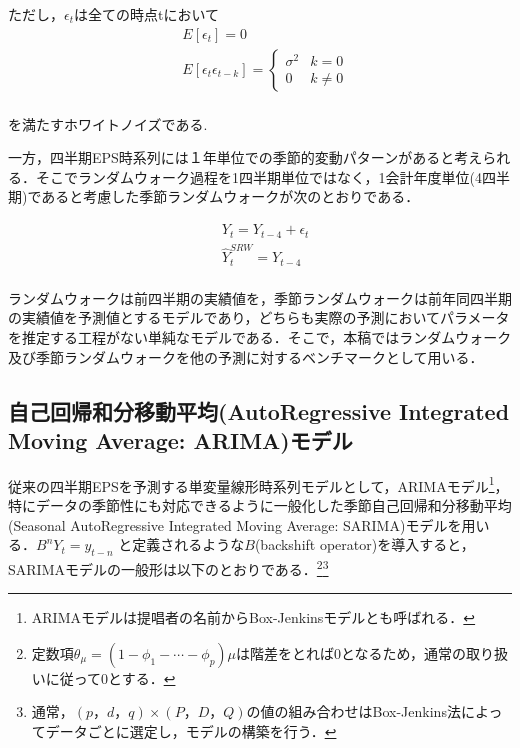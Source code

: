 \documentclass[a4paper，11pt]{jsarticle}
\begin{document}
ただし，$\epsilon_t$は全ての時点tにおいて
\begin{equation}
  \begin{split}
    & E[\epsilon_t] = 0 \\
    & E[\epsilon_t \epsilon_{t-k}] = \left\{
      \begin{array}{ll}
        \sigma^2 & k=0 \\
        0 & k \neq 0
      \end{array}\right.\\
  \end{split}
\end{equation}    

を満たすホワイトノイズである.

一方，四半期EPS時系列には１年単位での季節的変動パターンがあると考えられる．そこでランダムウォーク過程を1四半期単位ではなく，1会計年度単位(4四半期)であると考慮した季節ランダムウォークが次のとおりである．

\begin{equation}
  \begin{split}
    & Y_t = Y_{t-4} + \epsilon_t \\
    & \hat{Y}_t^{SRW} = Y_{t-4} \\
  \end{split}
\end{equation} 

ランダムウォークは前四半期の実績値を，季節ランダムウォークは前年同四半期の実績値を予測値とするモデルであり，どちらも実際の予測においてパラメータを推定する工程がない単純なモデルである．そこで，本稿ではランダムウォーク及び季節ランダムウォークを他の予測に対するベンチマークとして用いる．

\subsection{自己回帰和分移動平均(AutoRegressive Integrated Moving Average: ARIMA)モデル}

従来の四半期EPSを予測する単変量線形時系列モデルとして，ARIMAモデル\footnote{ARIMAモデルは提唱者の名前からBox-Jenkinsモデルとも呼ばれる．}，特にデータの季節性にも対応できるように一般化した季節自己回帰和分移動平均(Seasonal AutoRegressive Integrated Moving Average: SARIMA)モデルを用いる．$B^nY_t = y_{t-n}$ と定義されるような$B$(backshift operator)を導入すると，SARIMAモデルの一般形は以下のとおりである．\footnote{定数項$\theta_{\mu}=(1-\phi_1-\cdots-\phi_p)\mu$は階差をとれば0となるため，通常の取り扱いに従って0とする．}\footnote{通常，$(p，d，q) \times (P，D，Q)$の値の組み合わせはBox-Jenkins法によってデータごとに選定し，モデルの構築を行う．}
\end{document}
